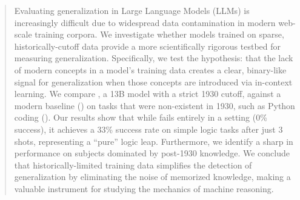 \begin{abstract}
Evaluating generalization in Large Language Models (LLMs) is increasingly difficult due to widespread data contamination in modern web-scale training corpora. We investigate whether models trained on sparse, historically-cutoff data provide a more scientifically rigorous testbed for measuring generalization. Specifically, we test the \hypo hypothesis: that the lack of modern concepts in a model's training data creates a clear, binary-like signal for generalization when those concepts are introduced via in-context learning. We compare \talkie, a 13B model with a strict 1930 cutoff, against a modern baseline (\talkieweb) on tasks that were non-existent in 1930, such as Python coding (\humaneval). Our results show that while \talkie fails entirely in a \zeroshot setting (0\% success), it achieves a 33\% success rate on simple logic tasks after just 3 shots, representing a ``pure'' logic leap. Furthermore, we identify a sharp \cliff in performance on subjects dominated by post-1930 knowledge. We conclude that historically-limited training data simplifies the detection of generalization by eliminating the noise of memorized knowledge, making \talkie a valuable instrument for studying the mechanics of machine reasoning.
\end{abstract}
